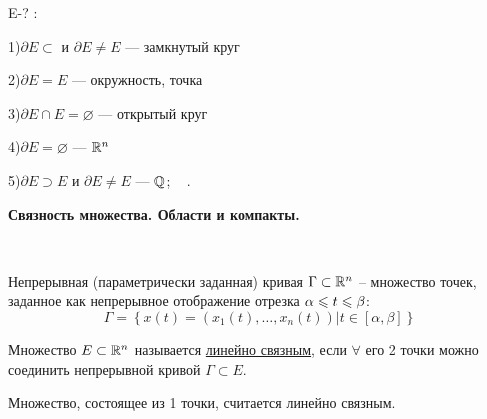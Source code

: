 \Examples E-? : \parbox[t]{0.95\textwidth}{
1)$\partial E \subset$ и $\partial E \neq E$ --- замкнутый круг

2)$\partial E = E$ --- окружность, точка

3)$\partial E \cap E = \varnothing$  --- открытый круг

4)$\partial E = \varnothing$  --- $\mathbb{R}^n$

5)$\partial E \supset E$ и $\partial E \neq E$ --- $\mathbb{Q}$; \  .}


\newpage

\smallskip

 \textbf{Связность множества. Области и компакты.}

\Remind 

~~\parbox[t]{0.95\linewidth} {
	Непрерывная (параметрически заданная) кривая $	\Gamma \subset \mathbb{R}^n$ -- множество 		точек, заданное как непрерывное отображение отрезка $\alpha \leqslant t \leqslant \beta$: 
	$$ \Gamma = \left\{ x(t) = (x_1(t), \ldots, x_n(t)) | t \in [\alpha,\beta] \right\}$$
}

\Def \parbox[t]{0.95\linewidth} {
	Множество $E \subset \mathbb{R}^n$ называется \underline{линейно связным}, если $\forall$ его 2 			точки можно соединить непрерывной кривой $\Gamma \subset E$.
}

\Note Множество, состоящее из 1 точки, считается линейно связным.

